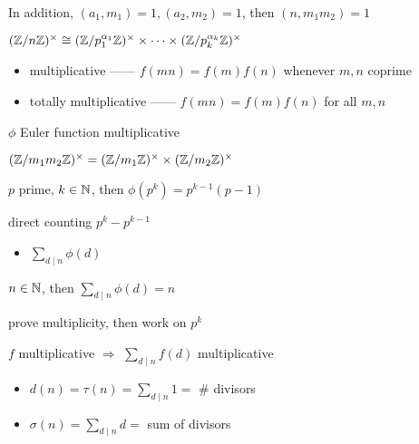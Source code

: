 \begin{cor}
    In addition, $(a_1, m_1) = 1, (a_2, m_2) = 1$, then $(n, m_1 m_2) = 1$
\end{cor}

\begin{fact}
    $(\mathbb{Z}/n\mathbb{Z})^\times \cong (\mathbb{Z}/p_1^{\alpha_1}\mathbb{Z})^\times \times \cdots \times (\mathbb{Z}/p_k^{\alpha_k}\mathbb{Z})^\times$
\end{fact}

\begin{itemize}
    \item multiplicative ------ $f(mn) = f(m)f(n)$ whenever $m, n$ coprime
    \item totally multiplicative ------ $f(mn) = f(m)f(n)$ for all $m, n$
\end{itemize}

\begin{cor}
    $\phi$ Euler function multiplicative
\end{cor}
\begin{pf}
    $(\mathbb{Z}/m_1 m_2\mathbb{Z})^\times = (\mathbb{Z}/m_1\mathbb{Z})^\times \times (\mathbb{Z}/m_2\mathbb{Z})^\times$
\end{pf}

\begin{lemma}
    $p$ prime, $k \in \mathbb{N}$, then $\phi(p^k) = p^{k-1}(p - 1)$
\end{lemma}
\begin{pf}
    direct counting $p^k - p^{k-1}$
\end{pf}

\begin{itemize}
    \item $\sum_{d \mid n} \phi(d)$
\end{itemize}

\begin{lemma}
    $n \in \mathbb{N}$, then $\sum_{d \mid n} \phi(d) = n$
\end{lemma}
\begin{pf}
    prove multiplicity, then work on $p^k$
\end{pf}

\begin{cor}
    $f$ multiplicative $\Rightarrow$ $\sum_{d \mid n} f(d)$ multiplicative
\end{cor}

\begin{itemize}
    \item $d(n) = \tau(n) = \sum_{d \mid n} 1 = $ \# divisors
    \item $\sigma(n) = \sum_{d \mid n} d = $ sum of divisors
\end{itemize}

